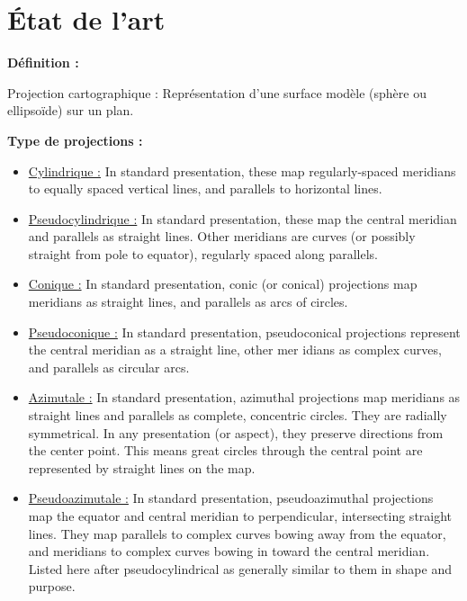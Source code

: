 \documentclass{article}
\begin{document}
\vspace{1\baselineskip}
\section{ État de l'art}

\textbf{Définition :} \newline

Projection cartographique : Représentation
d'une surface modèle (sphère ou ellipsoïde) sur un plan. \newline

\textbf{Type de projections :}
\begin{itemize}
    \item \underline{Cylindrique :}
        In standard presentation, these map regularly-spaced meridians to equally spaced 
        vertical lines, and parallels to horizontal lines.
    \item \underline{Pseudocylindrique :}
        In standard presentation, these map the central meridian and parallels as straight lines. 
        Other meridians are curves (or possibly straight from pole to equator), regularly spaced 
        along parallels.
    \item \underline{Conique :}
         In standard presentation, conic (or conical) projections map meridians as straight lines, 
        and parallels as arcs of circles.
    \item \underline{Pseudoconique :}
        In standard presentation, pseudoconical projections represent the central meridian as a 
        straight line, other mer
        idians as complex curves, and parallels as circular arcs.
    \item \underline{Azimutale :}
        In standard presentation, azimuthal projections map meridians as straight lines and 
        parallels as complete, concentric circles. They are radially symmetrical. In any 
        presentation (or aspect), they preserve directions from the center point. This means great 
        circles through the central point are represented by straight lines on the map.
    \item \underline{Pseudoazimutale :}
        In standard presentation, pseudoazimuthal projections map the equator
        and central meridian to perpendicular, intersecting straight lines. They map parallels to complex 
        curves bowing away from the equator, and meridians to complex curves bowing in toward 
        the central meridian. Listed here after pseudocylindrical as generally 
        similar to them in shape and purpose.
\end{itemize}
\end{document}
